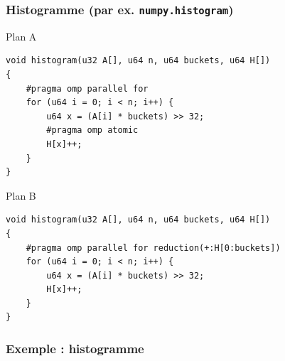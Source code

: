 \documentclass[xcolor={x11names,svgnames}]{beamer}
\begin{document}
\begin{frame}[fragile]
  \frametitle{Histogramme (par ex. \texttt{numpy.histogram})}


  \begin{block}{Plan A}
\begin{verbatim}
void histogram(u32 A[], u64 n, u64 buckets, u64 H[])
{
    #pragma omp parallel for
    for (u64 i = 0; i < n; i++) {
        u64 x = (A[i] * buckets) >> 32;
        #pragma omp atomic
        H[x]++;
    }
}
\end{verbatim}
  \end{block}

    \begin{block}{Plan B}
\begin{verbatim}
void histogram(u32 A[], u64 n, u64 buckets, u64 H[])
{
    #pragma omp parallel for reduction(+:H[0:buckets])
    for (u64 i = 0; i < n; i++) {
        u64 x = (A[i] * buckets) >> 32;
        H[x]++;
    }
}
\end{verbatim}
  \end{block}

\end{frame}


\begin{frame}[label=histogram_curve]
  \frametitle{Exemple : histogramme}

\end{frame}
\end{document}
